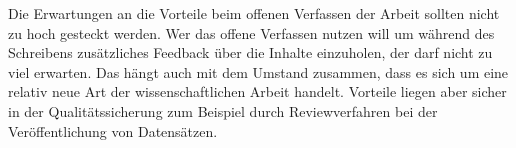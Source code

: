 Die Erwartungen an die Vorteile beim offenen Verfassen der Arbeit sollten nicht zu hoch gesteckt werden. Wer das offene Verfassen nutzen will um während des Schreibens zusätzliches Feedback über die Inhalte einzuholen, der darf nicht zu viel erwarten. Das hängt auch mit dem Umstand zusammen, dass es sich um eine relativ neue Art der wissenschaftlichen Arbeit handelt. Vorteile liegen aber sicher in der Qualitätssicherung zum Beispiel durch Reviewverfahren bei der Veröffentlichung von Datensätzen.
